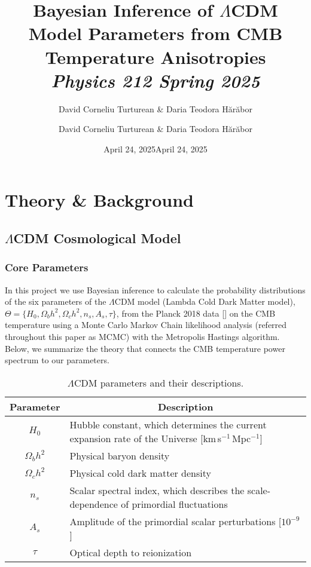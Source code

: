 \documentclass[11pt]{article}
\author{David Corneliu Turturean \& Daria Teodora Hărăbor}
\date{April 24, 2025}
\title{%
  \textrm{Bayesian Inference of $\Lambda$CDM Model Parameters from CMB Temperature Anisotropies}\\[1ex]
  {\large\itshape Physics 212 Spring 2025}%
}
\author{David Corneliu Turturean \& Daria Teodora Hărăbor}
\date{April 24, 2025}
\theoremstyle{definition}
\begin{document}
\maketitle

\newpage

\section{Theory \& Background}
\label{sec:theory}

\subsection{$\Lambda$CDM Cosmological Model}

\subsubsection{Core Parameters}
In this project we use Bayesian inference to calculate the probability distributions of the six parameters of the \(\Lambda\)CDM model (Lambda Cold Dark Matter model),
\(\Theta=\{H_0,\Omega_b h^2,\Omega_c h^2,n_s,A_s,\tau\}\), from the Planck 2018 data [\cite{planck2018}] on the CMB temperature using a Monte Carlo Markov Chain likelihood analysis (referred throughout this paper as MCMC) with the Metropolis Hastings algorithm. Below, we summarize the theory that connects the CMB temperature power spectrum to our parameters.

\begin{table}[h!]
  \centering
  \small
  \caption{$\Lambda$CDM parameters and their descriptions.}
  \label{tab:params_short}
  \begin{tabular}{c l}
    \toprule
    \multicolumn{1}{c}{\textbf{Parameter}} & 
    \multicolumn{1}{c}{\textbf{Description}} \\
    \midrule
    $H_0$           & Hubble constant, which determines the current expansion rate of the Universe [km\,s$^{-1}$\,Mpc$^{-1}$] \\
    $\Omega_bh^2$   & Physical baryon density                                                                             \\
    $\Omega_ch^2$   & Physical cold dark matter density                                                                   \\
    $n_s$           & Scalar spectral index, which describes the scale-dependence of primordial fluctuations               \\
    $A_s$           & Amplitude of the primordial scalar perturbations [$10^{-9}$]                                        \\
    $\tau$          & Optical depth to reionization                                                                       \\
    \bottomrule
  \end{tabular}
\end{table}
\end{document}
